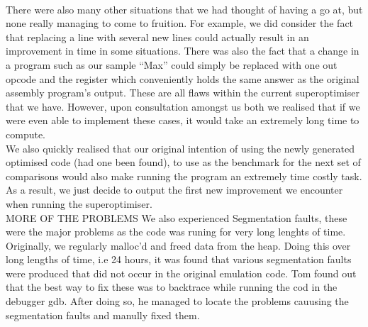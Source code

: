 \documentclass[11pt]{article}
\begin{document}
\\
\indent There were also many other situations that we had thought of having a go at, but none really managing to come to fruition. For example, we did consider the fact that replacing  a line with several new lines could actually result in an improvement in time in some situations. There was also the fact that a change in a program such as our sample “Max” could simply be replaced with one out opcode and the register which conveniently holds the same answer as the original assembly program's output. These are all flaws within the current superoptimiser that we have. However, upon consultation amongst us both we realised that if we were even able to implement these cases, it would take an extremely long time to compute.
\\
\indent We also quickly realised that our original intention of using the newly generated optimised code (had one been found), to use as the benchmark for the next set of comparisons would also make running the program an extremely time costly task. As a result, we just decide to output the first new improvement we encounter when running the superoptimiser. 
\\
MORE OF THE PROBLEMS
\indent We also experienced Segmentation faults, these were the major problems as the code was runing for very long lenghts of time. Originally, we regularly malloc'd and freed data from the heap. Doing this over long lengths of time, i.e 24 hours, it was found that various segmentation faults were produced that did not occur in the original emulation code. Tom found out that the best way to fix these was to backtrace while running the cod in the debugger gdb. After doing so, he managed to locate the problems cauusing the segmentation faults and manully fixed them.
\end{document}
